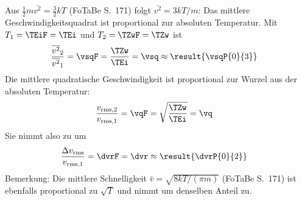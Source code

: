 Aus $\frac{1}{2}m\overline{v^2} = \frac{3}{2}kT$ (FoTaBe S.~171) folgt $\overline{v^2} = 3kT/m$: Das mittlere Geschwindigkeitsquadrat ist proportional zur absoluten Temperatur. Mit $T_1 = \TEiF = \TEi$ und $T_2 = \TZwF = \TZw$ ist
\begin{align}
 \frac{\overline{v^2}_2}{\overline{v^2}_1} &= \vsqF = \frac{\TZw}{\TEi} = \vsq \approx \result{\vsqP{0}{3}}
\end{align}
Die mittlere quadratische Geschwindigkeit ist proportional zur Wurzel aus der absoluten Temperatur:
\begin{align}
 \frac{v_{\text{rms},2}}{v_{\text{rms},1}} &= \vqF = \sqrt{\frac{\TZw}{\TEi}} = \vq
\end{align}
Sie nimmt also zu um
\begin{align}
 \frac{\Delta v_\text{rms}}{v_{\text{rms},1}} &= \dvrF = \dvr \approx \result{\dvrP{0}{2}}
\end{align}
Bemerkung: Die mittlere Schnelligkeit $\bar v = \sqrt{8kT/(\pi m)}$ (FoTaBe S.~171) ist ebenfalls proportional zu $\sqrt{T}$ und nimmt um denselben Anteil zu.
